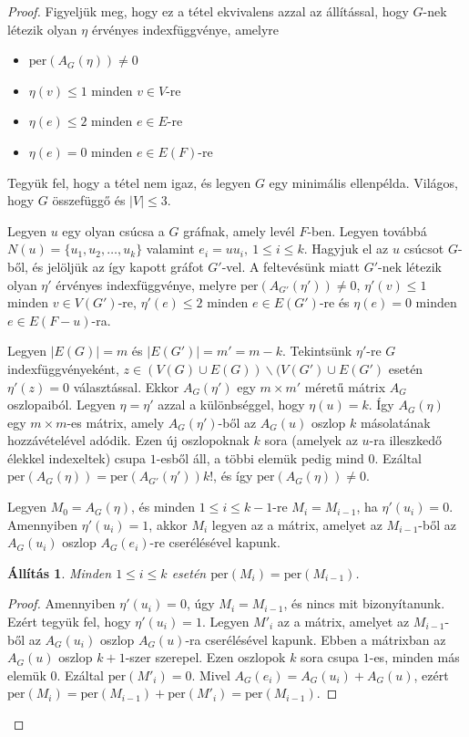 \documentclass[12pt, a4paper]{report}
\newtheorem{áll}[tét]{Állítás}
\theoremstyle{remark}
\theoremstyle{definition}
\begin{document}
\begin{proof}
Figyeljük meg, hogy ez a tétel ekvivalens azzal az állítással, hogy $G$-nek létezik olyan $\eta$ érvényes indexfüggvénye, amelyre
\begin{itemize}
\item $\mathrm{per}(A_G(\eta)) \neq 0$
\item $\eta(v) \leq 1$ minden $v \in V$-re
\item $\eta(e) \leq 2$ minden $e \in E$-re
\item $\eta(e) = 0$ minden $e \in E(F)$-re
\end{itemize}

Tegyük fel, hogy a tétel nem igaz, és legyen $G$ egy minimális ellenpélda. Világos, hogy $G$ összefüggő és $|V| \leq 3$.

Legyen $u$ egy olyan csúcsa a $G$ gráfnak, amely levél $F$-ben. Legyen továbbá $N(u) = \lbrace u_1, u_2, \ldots, u_k \rbrace$ valamint $e_i = uu_i,\ 1 \leq i \leq k$. Hagyjuk el az $u$ csúcsot $G$-ből, és jelöljük az így kapott gráfot $G'$-vel. A feltevésünk miatt $G'$-nek létezik olyan $\eta'$ érvényes indexfüggvénye, melyre $\mathrm{per}(A_{G'}(\eta')) \neq 0$, $\eta'(v) \leq 1$ minden $v \in V(G')$-re, $\eta'(e) \leq 2$ minden $e \in E(G')$-re és $\eta(e) = 0$ minden $e \in E(F - u)$-ra.

Legyen $|E(G)| = m$ és $|E(G')| = m' = m - k$. Tekintsünk $\eta'$-re $G$ indexfüggvényeként, $z \in (V(G) \cup E(G)) \smallsetminus (V(G') \cup E(G')$ esetén $\eta'(z) = 0$ választással. Ekkor $A_G(\eta')$ egy $m \times m'$ méretű mátrix $A_G$ oszlopaiból. Legyen $\eta = \eta'$ azzal a különbséggel, hogy $\eta(u) = k$. Így $A_G(\eta)$ egy $m \times m$-es mátrix, amely $A_G(\eta')$-ből az $A_G(u)$ oszlop $k$ másolatának hozzávételével adódik. Ezen új oszlopoknak $k$ sora (amelyek az $u$-ra illeszkedő élekkel indexeltek) csupa $1$-esből áll, a többi elemük pedig mind $0$. Ezáltal $\mathrm{per}(A_G(\eta)) = \mathrm{per}(A_{G'}(\eta')) k!$, és így $\mathrm{per}(A_G(\eta)) \neq 0$.

Legyen $M_0 = A_G(\eta)$, és minden $1 \leq i \leq k - 1$-re $M_i = M_{i - 1}$, ha $\eta'(u_i) = 0$. Amennyiben $\eta'(u_i) = 1$, akkor $M_i$ legyen az a mátrix, amelyet az $M_{i - 1}$-ből az $A_G(u_i)$ oszlop $A_G(e_i)$-re cserélésével kapunk.

\begin{áll}
Minden $1 \leq i \leq k$ esetén $\mathrm{per}(M_i) = \mathrm{per}(M_{i - 1})$.
\end{áll}

\begin{proof}
Amennyiben $\eta'(u_i) = 0$, úgy $M_i = M_{i - 1}$, és nincs mit bizonyítanunk. Ezért tegyük fel, hogy $\eta'(u_i) = 1$. Legyen $M'_i$ az a mátrix, amelyet az $M_{i - 1}$-ből az $A_G(u_i)$ oszlop $A_G(u)$-ra cserélésével kapunk. Ebben a mátrixban az $A_G(u)$ oszlop $k + 1$-szer szerepel. Ezen oszlopok $k$ sora csupa $1$-es, minden más elemük $0$. Ezáltal $\mathrm{per}(M'_i) = 0$. Mivel $A_G(e_i) = A_G(u_i) + A_G(u)$, ezért $\mathrm{per}(M_i) = \mathrm{per}(M_{i - 1}) + \mathrm{per}(M'_i) = \mathrm{per}(M_{i - 1})$.
\end{proof}


\end{proof}
\end{document}
